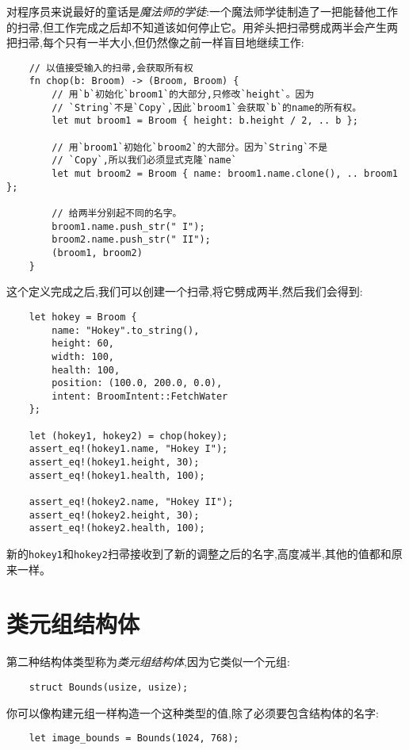 对程序员来说最好的童话是\emph{魔法师的学徒}:一个魔法师学徒制造了一把能替他工作的扫帚,但工作完成之后却不知道该如何停止它。用斧头把扫帚劈成两半会产生两把扫帚,每个只有一半大小,但仍然像之前一样盲目地继续工作:
\begin{verbatim}
    // 以值接受输入的扫帚,会获取所有权
    fn chop(b: Broom) -> (Broom, Broom) {
        // 用`b`初始化`broom1`的大部分,只修改`height`。因为
        // `String`不是`Copy`,因此`broom1`会获取`b`的name的所有权。
        let mut broom1 = Broom { height: b.height / 2, .. b };

        // 用`broom1`初始化`broom2`的大部分。因为`String`不是
        // `Copy`,所以我们必须显式克隆`name`
        let mut broom2 = Broom { name: broom1.name.clone(), .. broom1 };

        // 给两半分别起不同的名字。
        broom1.name.push_str(" I");
        broom2.name.push_str(" II");
        (broom1, broom2)
    }
\end{verbatim}

这个定义完成之后,我们可以创建一个扫帚,将它劈成两半,然后我们会得到:
\begin{verbatim}
    let hokey = Broom {
        name: "Hokey".to_string(),
        height: 60,
        width: 100,
        health: 100,
        position: (100.0, 200.0, 0.0),
        intent: BroomIntent::FetchWater
    };

    let (hokey1, hokey2) = chop(hokey);
    assert_eq!(hokey1.name, "Hokey I");
    assert_eq!(hokey1.height, 30);
    assert_eq!(hokey1.health, 100);

    assert_eq!(hokey2.name, "Hokey II");
    assert_eq!(hokey2.height, 30);
    assert_eq!(hokey2.health, 100);
\end{verbatim}

新的\texttt{hokey1}和\texttt{hokey2}扫帚接收到了新的调整之后的名字,高度减半,其他的值都和原来一样。

\section{类元组结构体}

第二种结构体类型称为\emph{类元组结构体},因为它类似一个元组:
\begin{verbatim}
    struct Bounds(usize, usize);
\end{verbatim}

你可以像构建元组一样构造一个这种类型的值,除了必须要包含结构体的名字:
\begin{verbatim}
    let image_bounds = Bounds(1024, 768);
\end{verbatim}

